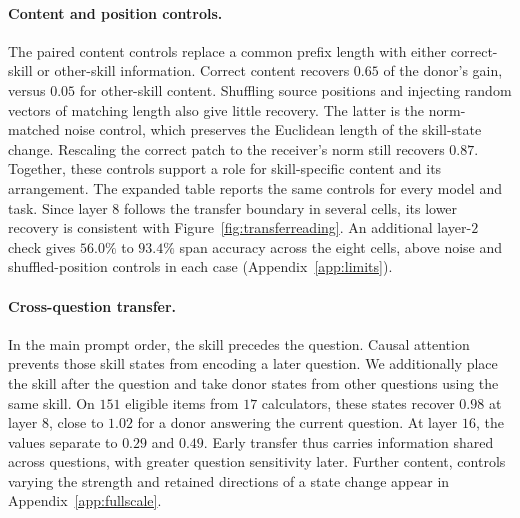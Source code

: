 \begin{table}[t]
\centering
\caption{Main depth comparison across four open-weight models and two benchmarks.
$n/G$ gives common eligible questions/skill groups. $T$ and $R$ are the first
half-effect crossings for transfer ($\rho<0.5$) and aggregate source dependence
($d\le0.5$). $\Delta=R-T$ is in layers. $\Delta/D$ normalizes the gap
by the model's layer count. All eight cells use audited common-item populations.}
\label{tab:paireddepth}
\normalfont\rmfamily\fontsize{9}{11}\selectfont
\renewcommand{\arraystretch}{1.18}
\setlength{\tabcolsep}{3pt}

\end{table}

\paragraph{Content and position controls.}
The paired content controls replace a common prefix length with either
correct-skill or other-skill information. Correct content recovers $0.65$
of the donor's gain, versus $0.05$ for other-skill content. Shuffling source
positions and injecting random vectors of matching length also give little
recovery. The latter is the norm-matched noise control, which preserves
the Euclidean length of the skill-state change. Rescaling
the correct patch to the receiver's norm still recovers $0.87$.
Together, these controls support a role for skill-specific content and
its arrangement.
The expanded table reports the same controls for every model and task.
Since layer $8$ follows the transfer boundary in several cells, its lower
recovery is consistent with Figure~\ref{fig:transferreading}.
An additional layer-$2$ check gives $56.0\%$ to $93.4\%$ span accuracy
across the eight cells, above noise and shuffled-position controls
in each case (Appendix~\ref{app:limits}).

\paragraph{Cross-question transfer.}
\label{sec:whose}
In the main prompt order, the skill precedes the question. Causal attention
prevents those skill states from encoding a later question. We additionally
place the skill after the question and take donor states from other
questions using the same skill. On $151$ eligible items from $17$
calculators, these states recover $0.98$ at layer $8$, close to $1.02$ for
a donor answering the current question. At layer $16$, the values separate
to $0.29$ and $0.49$. Early transfer thus carries information shared across
questions, with greater question sensitivity later. Further content,
controls varying the strength and retained directions of a state change
appear in Appendix~\ref{app:fullscale}.

